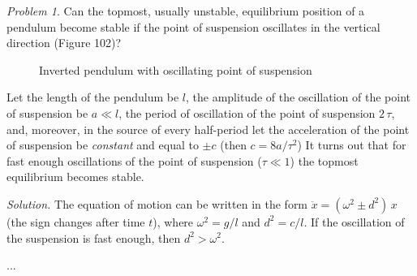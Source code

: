 \documentclass[leqno]{book}
\numberwithin{equation}{section}
\theoremstyle{plain}
\theoremstyle{definition}
\theoremstyle{remark}
\theoremstyle{smallcap}
\newtheorem*{prob*}{Problem}
\numberwithin{prob}{section}
\newcommand{\solution}[1]{\textit{Solution.} #1}
\begin{document}
\begin{prob*}
  Can the topmost, usually unstable, equilibrium position of
  a pendulum become stable if the point of suspension oscillates
  in the vertical direction (Figure 102)?

  \setcounter{figure}{101}
  \begin{figure}[h]
    \centering
    \caption{
    Inverted pendulum with oscillating point of suspension
    }
  \end{figure}

  Let the length of the pendulum be $l$,
  the amplitude of the oscillation of the point of suspension
  be $a \ll l$,
  the period of oscillation of the point of suspension $2 \,\tau$,
  and, moreover,
  in the source of every half-period let the acceleration
  of the point of suspension be \emph{constant} and equal to $\pm c$
  (then $c = 8a/\tau^2$)
  It turns out that for fast enough oscillations of the point
  of suspension ($\tau \ll 1$)
  the topmost equilibrium becomes stable.

  \solution{
    The equation of motion can be written in the form
    $\ddot x = (\omega^2 \pm d^2) \, x$
    (the sign changes after time $t$),
    where $\omega^2 = g/l$
    and $d^2 = c/l$.
    If the oscillation of the suspension is fast enough,
    then $d^2 > \omega^2$.

    ...
  }
\end{prob*}
\end{document}
